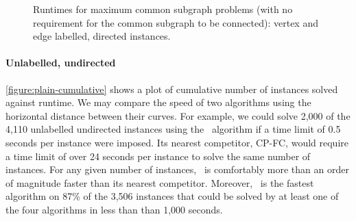 \begin{figure}[h!]
    \centering
    \par\bigskip
    \caption{Runtimes for maximum
    common subgraph problems (with no requirement for the common subgraph
    to be connected): vertex and edge labelled, directed instances.}\label{figure:mcs-cumulative-labelled-not-connected}
\end{figure}

\paragraph{Unlabelled, undirected}
\cref{figure:plain-cumulative} shows a plot of cumulative 
number of instances solved against runtime.  We may compare
the speed of two algorithms using the horizontal distance between their curves.
For example, we could solve 2,000 of the 4,110 unlabelled undirected instances
using the \McSplit\ algorithm if a time limit of 0.5 seconds per instance were
imposed.  Its nearest competitor, CP-FC, would require a time limit of over 24
seconds per instance to solve the same number of instances.  For any given
number of instances, \McSplit\ is comfortably more than an order of magnitude
faster than its nearest competitor.  Moreover, \McSplit\ is the fastest algorithm
on 87\% of the 3,506 instances that
could be solved by at least one of the four algorithms in less than than
1,000 seconds.

